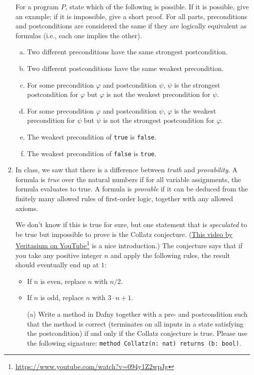\documentclass{article}
\newcommand{\visiblehref}[2]{\href{#1}{#2}\footnote{\url{#1}}}
\begin{document}
\begin{enumerate}
For a program $P$, state which of the following is possible.
If it is possible, give an example;
if it is impossible, give a short proof.
For all parts, preconditions and postconditions are considered the same if they are
logically equivalent as formulas (i.e., each one implies the other).

\begin{enumerate}[(a)]
\item
Two different preconditions have the same strongest postcondition.
\item
Two different postconditions have the same weakest precondition.
\item For some precondition $\varphi$ and postcondition $\psi$, $\psi$ is the strongest postcondition for $\varphi$ but $\varphi$ is not the weakest precondition for $\psi$.
\item For some precondition $\varphi$ and postcondition $\psi$,
$\varphi$ is the weakest precondition for $\psi$ but $\psi$ is not the strongest postcondition for $\varphi$.
\item
The weakest precondition of \texttt{true} is \texttt{false}.
\item
The weakest precondition of \texttt{false} is \texttt{true}.
\end{enumerate}

\item
In class, we saw that there is a difference between
\emph{truth} and \emph{provability}. A formula is \emph{true} over the natural numbers
if for all variable assignments, the formula evaluates to true.
A formula is \emph{provable} if it can be deduced from the finitely many allowed
rules of first-order logic, together with any allowed axioms.

We don't know if this is true for sure, but one statement that is \emph{speculated} to be true but impossible to prove is the Collatz conjecture.
(\visiblehref{https://www.youtube.com/watch?v=094y1Z2wpJg}{This video by Veritasium on YouTube} is a nice introduction.)
The conjecture says that if you take any positive integer $n$ and apply the following rules, the result should eventually end up at $1$:
\begin{itemize}
\item If $n$ is even, replace $n$ with $n / 2$.
\item If $n$ is odd, replace $n$ with $3 \cdot n + 1$.
\end{itemize}

\begin{enumerate}
\item[(a)]
Write a method in Dafny together with a pre- and postcondition
such that the method is correct (terminates on all inputs in a state satisfying the postcondition)
if and only if the Collatz conjecture is true. Please use the following signature: \texttt{method Collatz(n: nat) returns (b: bool)}.


\end{enumerate}
\end{enumerate}
\end{document}
